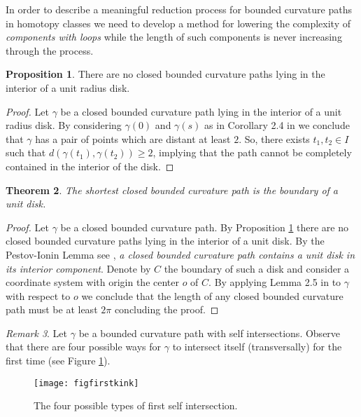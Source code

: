 \documentclass{amsart}
\newtheorem{theorem}{Theorem}[section]
\theoremstyle{definition}
\newtheorem{proposition}[theorem]{Proposition}
\theoremstyle{remark}
\newtheorem{remark}[theorem]{Remark}
\numberwithin{equation}{section}
\begin{document}
 
 In order to describe a meaningful reduction process for bounded curvature paths in homotopy classes we need to develop a method for lowering the complexity of {\it components with loops} while the length of such components is never increasing through the process. 

\begin{proposition}\label{noclor} There are no closed bounded curvature paths lying in the interior of a unit radius disk.
\end{proposition}
\begin{proof} Let  $\gamma$ be a closed bounded curvature path lying in the interior of a unit radius disk. By considering $\gamma(0)$ and $\gamma(s)$ as in Corollary 2.4 in \cite{papere}  we conclude that $\gamma$ has a pair of points which are distant at least $2$. So, there exists $t_1,t_2\in I$ such that $d(\gamma(t_1),\gamma(t_2))\geq 2$, implying that the path cannot be completely contained in the interior of the disk.
\end{proof}

\begin{theorem} \label{loopbound} The shortest closed bounded curvature path is the boundary of a unit disk.
\end{theorem}

\begin{proof}  Let $\gamma$ be a closed bounded curvature path. By Proposition \ref{noclor} there are no closed bounded curvature paths lying in the interior of a unit disk. By the Pestov-Ionin Lemma see \cite{pestov}, {\it a closed bounded curvature path contains a unit disk in its interior component}. Denote by $C$ the boundary of such a disk and consider a coordinate system with origin the center $o$ of $C$. By applying Lemma 2.5 in \cite{papera} to $\gamma$ with respect to $o$ we conclude that the length of any closed bounded curvature path must be at least $2 \pi$ concluding the proof.\end{proof}

\begin{remark}
 Let $\gamma$ be a bounded curvature path with self intersections. Observe that there are four possible ways for $\gamma$ to intersect itself (transversally) for the first time (see Figure \ref{figfirstkink}).
 \end{remark}

{ \begin{figure} [[htbp]
 \begin{center}
\texttt{[image: figfirstkink]}
\end{center}
\caption{The four possible types of first self intersection.}
 \label{figfirstkink}
\end{figure}}
\end{document}
